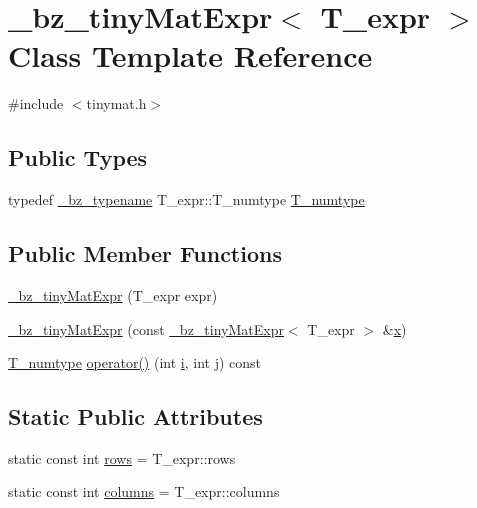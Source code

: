 \hypertarget{class__bz__tinyMatExpr}{}\section{\+\_\+bz\+\_\+tiny\+Mat\+Expr$<$ T\+\_\+expr $>$ Class Template Reference}
\label{class__bz__tinyMatExpr}


{\ttfamily \#include $<$tinymat.\+h$>$}

\subsection*{Public Types}
\begin{DoxyCompactItemize}
\item 
typedef \hyperlink{compiler_8h_a1bc40add3e72effc9cf69dbe445cbdfd}{\+\_\+bz\+\_\+typename} T\+\_\+expr\+::\+T\+\_\+numtype \hyperlink{class__bz__tinyMatExpr_a49d57cf863993ef8ac0098c3d22884ad}{T\+\_\+numtype}
\end{DoxyCompactItemize}
\subsection*{Public Member Functions}
\begin{DoxyCompactItemize}
\item 
\hyperlink{class__bz__tinyMatExpr_a2484c086b6db50c5841200cbe9e29afd}{\+\_\+bz\+\_\+tiny\+Mat\+Expr} (T\+\_\+expr expr)
\item 
\hyperlink{class__bz__tinyMatExpr_a4d82cf2b4185f88cfd63432e5986a637}{\+\_\+bz\+\_\+tiny\+Mat\+Expr} (const \hyperlink{class__bz__tinyMatExpr}{\+\_\+bz\+\_\+tiny\+Mat\+Expr}$<$ T\+\_\+expr $>$ \&\hyperlink{vecnorm1_8cc_ac73eed9e41ec09d58f112f06c2d6cb63}{x})
\item 
\hyperlink{class__bz__tinyMatExpr_a49d57cf863993ef8ac0098c3d22884ad}{T\+\_\+numtype} \hyperlink{class__bz__tinyMatExpr_a5f97fe8e4057ef8d3efcd11eda07cb12}{operator()} (int \hyperlink{indexexpr_8h_aabd77643995707c185e95c8cb2782c81}{i}, int \hyperlink{indexexpr_8h_aa1f3325d66516548e69238097857fa98}{j}) const 
\end{DoxyCompactItemize}
\subsection*{Static Public Attributes}
\begin{DoxyCompactItemize}
\item 
static const int \hyperlink{class__bz__tinyMatExpr_aad6620184c1ba01b93ba16bec5d1b00a}{rows} = T\+\_\+expr\+::rows
\item 
static const int \hyperlink{class__bz__tinyMatExpr_a9b18bd91e4189d5318488d6a79e44815}{columns} = T\+\_\+expr\+::columns
\end{DoxyCompactItemize}
